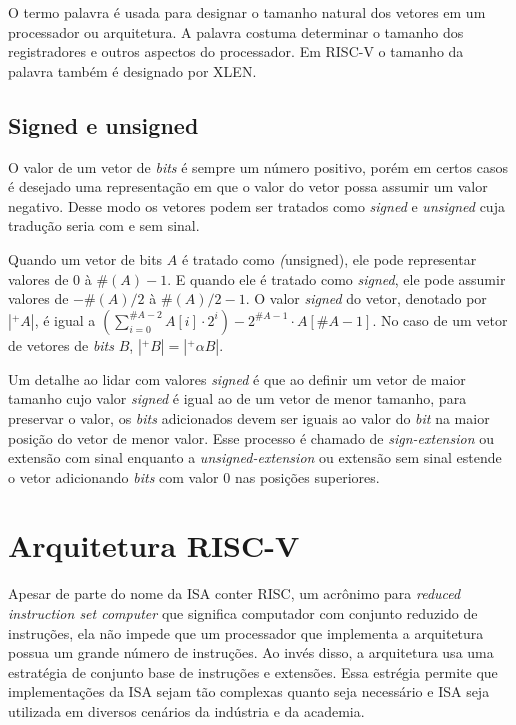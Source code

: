   O termo palavra é usada para designar o tamanho natural dos vetores em um processador ou arquitetura. 
  A palavra costuma determinar o tamanho dos registradores e outros aspectos do processador. 
  Em RISC-V o tamanho da palavra também é designado por XLEN.

\subsection{Signed e unsigned}
\label{sec:seu}

  O valor de um vetor de \emph{bits} é sempre um número positivo, porém em certos casos é desejado
  uma representação em que o valor do vetor possa assumir um valor negativo. Desse modo os vetores
  podem ser tratados como \emph{signed} e \emph{unsigned} cuja tradução seria com e sem sinal.

  Quando um vetor de bits $A$ é tratado como \emph(unsigned), ele pode representar valores de $0$ à
  $\#(A) - 1$. E quando ele é tratado como \emph{signed}, ele pode assumir valores de $-\#(A)/2$ à 
  $\#(A)/2 - 1$. O valor \emph{signed} do vetor, denotado por $|^+A|$, é igual a $(\sum_{i =0}^{\#A-2}
  A[i]\cdot 2^i)-2^{\#A -1}\cdot A[\#A-1]$. No caso de um vetor de vetores de \emph{bits} $B$, 
  $|^+B| = |^+\alpha B|$.

  Um detalhe ao lidar com valores \emph{signed} é que ao definir um vetor de maior tamanho cujo valor 
  \emph{signed} é igual ao de um vetor de menor tamanho, para preservar o valor, os \emph{bits} adicionados 
  devem ser iguais ao valor do \emph{bit} na maior posição do vetor de menor valor. Esse processo é 
  chamado de \emph{sign-extension} ou extensão com sinal enquanto a \emph{unsigned-extension} ou extensão
  sem sinal estende o vetor adicionando \emph{bits} com valor $0$ nas posições superiores.

\newpage
\section{Arquitetura RISC-V}
\label{cap:isa}
  
  Apesar de parte do nome da ISA conter RISC, um acrônimo para \emph{reduced 
  instruction set computer} que significa computador com conjunto reduzido de instruções, 
  ela não impede que um processador que implementa a arquitetura possua um grande número 
  de instruções. Ao invés disso, a arquitetura usa uma estratégia de conjunto base de 
  instruções e extensões. Essa estrégia permite que implementações da ISA sejam tão complexas
  quanto seja necessário e ISA seja utilizada em diversos cenários da indústria e da academia.
  
